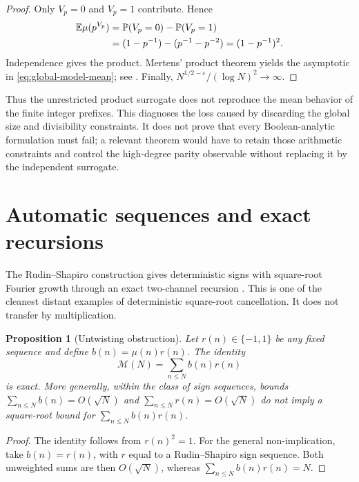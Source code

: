 \documentclass[11pt]{amsart}
\numberwithin{equation}{section}
\theoremstyle{plain}
\newtheorem{proposition}[theorem]{Proposition}
\theoremstyle{definition}
\theoremstyle{remark}
\newcommand{\Mertens}{\mathcal M}
\newcommand{\E}{\mathbb E}
\newcommand{\eps}{\varepsilon}
\begin{document}
\begin{proof}
Only \(V_p=0\) and \(V_p=1\) contribute.  Hence
\begin{align}
 \E\mu(p^{V_p})
 &=\mathbb P(V_p=0)-\mathbb P(V_p=1)\notag\\
 &=(1-p^{-1})-(p^{-1}-p^{-2})=(1-p^{-1})^2.
 \label{eq:local-proof}
\end{align}
Independence gives the product.  Mertens' product theorem yields the
asymptotic in \eqref{eq:global-model-mean}; see
\cite{MontgomeryVaughan2007}.  Finally,
\(N^{1/2-\eps}/(\log N)^2\to\infty\).
\end{proof}

Thus the unrestricted product surrogate does not reproduce the mean behavior
of the finite integer prefixes.  This diagnoses the loss caused by discarding
the global size and divisibility constraints.  It does not prove that every
Boolean-analytic formulation must fail; a relevant theorem would have to
retain those arithmetic constraints and control the high-degree parity
observable without replacing it by the independent surrogate.

\section{Automatic sequences and exact recursions}\label{sec:automatic}

The Rudin--Shapiro construction gives deterministic signs with square-root
Fourier growth through an exact two-channel recursion \cite{Rudin1959}.  This is
one of the cleanest distant examples of deterministic square-root cancellation.
It does not transfer by multiplication.

\begin{proposition}[Untwisting obstruction]\label{prop:untwist}
Let \(r(n)\in\{-1,1\}\) be any fixed sequence and define
\(b(n)=\mu(n)r(n)\).  The identity
\begin{equation}\label{eq:untwist}
  \Mertens(N)=\sum_{n\leq N}b(n)r(n)
\end{equation}
is exact.  More generally, within the class of sign sequences, bounds
\(\sum_{n\leq N}b(n)=O(\sqrt N)\) and
\(\sum_{n\leq N}r(n)=O(\sqrt N)\) do not imply a square-root bound for
\(\sum_{n\leq N}b(n)r(n)\).
\end{proposition}

\begin{proof}
The identity follows from \(r(n)^2=1\).  For the general non-implication, take
\(b(n)=r(n)\), with \(r\) equal to a Rudin--Shapiro sign sequence.  Both
unweighted sums are then \(O(\sqrt N)\), whereas
\(\sum_{n\leq N}b(n)r(n)=N\).
\end{proof}
\end{document}
